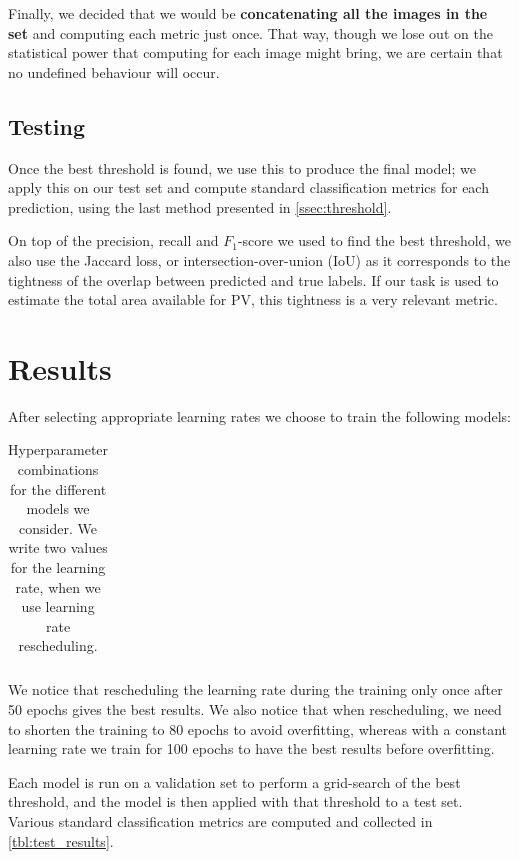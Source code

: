 \documentclass[10pt,conference]{IEEEtran}
\begin{document}
Finally, we decided that we would be \textbf{concatenating all the images
in the set} and computing each metric just once.
That way, though we lose out on the statistical power
that computing for each image might bring, we are
certain that no undefined behaviour will occur.

\subsection{Testing}
Once the best threshold is found, we use this to produce
the final model; we apply this on our test set and compute
standard classification metrics for each prediction,
using the last method presented in \autoref{ssec:threshold}.

On top of the precision, recall and $F_1$-score we used
to find the best threshold, we also use the
Jaccard loss, or intersection-over-union (IoU) as
it corresponds to the tightness of the overlap between
predicted and true labels.
If our task is used to estimate the total area available
for PV, this tightness is a very relevant metric.


\section{Results}
After selecting appropriate learning rates we choose to train the following models:
\begin{table}
    \begin{center}
        \begin{tabular}{||c | c c c c||}
             \hline
             
        \end{tabular}
    \end{center}
    \caption{Hyperparameter combinations for the different models we consider. We write two values for the learning rate, when we use learning rate rescheduling. 
    }
    \label{tbl:model_parameters}
\end{table} 



We notice that rescheduling the learning rate during the training only once after 50 epochs gives the best results.
We also notice that when rescheduling, we need to shorten the training to 80 epochs to avoid overfitting,
whereas with a constant learning rate we train for 100 epochs to have the best results before overfitting.

Each model is run on a validation set to perform a grid-search of the best threshold,
and the model is then applied with that threshold to a test set.
Various standard classification metrics are computed and collected in \autoref{tbl:test_results}.
\end{document}
